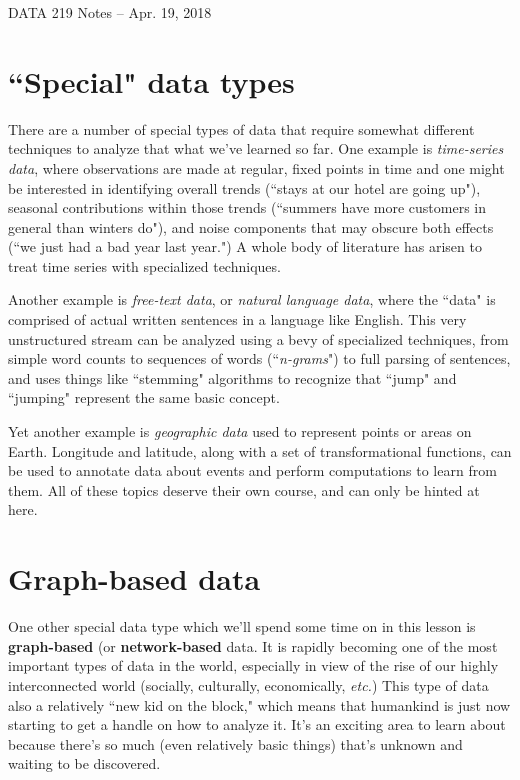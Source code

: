 \documentclass[12pt]{article}
\begin{document}
\begin{center}
\begin{Large}
DATA 219 Notes -- Apr. 19, 2018
\end{Large}
\end{center}

\section{``Special" data types}

There are a number of special types of data that require somewhat different 
techniques to analyze that what we've learned so far. One example is
\textit{time-series data}, where observations are made at regular, fixed
points in time and one might be interested in identifying overall trends
(``stays at our hotel are going up"), seasonal contributions within those
trends (``summers have more customers in general than winters do"), and noise
components that may obscure both effects (``we just had a bad year last
year.") A whole body of literature has arisen to treat time series with
specialized techniques.

Another example is \textit{free-text data}, or \textit{natural language data},
where the ``data" is comprised of actual written sentences in a language like
English. This very unstructured stream can be analyzed using a bevy of
specialized techniques, from simple word counts to sequences of words
(``\textit{n-grams}") to full parsing of sentences, and uses things like
``stemming" algorithms to recognize that ``jump" and ``jumping" represent the
same basic concept.

Yet another example is \textit{geographic data} used to represent points or
areas on Earth. Longitude and latitude, along with a set of transformational
functions, can be used to annotate data about events and perform computations
to learn from them. All of these topics deserve their own course, and can only
be hinted at here.

\section{Graph-based data}

One other special data type which we'll spend some time on in this lesson is
\textbf{graph-based} (or \textbf{network-based} data. It is rapidly becoming
one of the most important types of data in the world, especially in view of
the rise of our highly interconnected world (socially, culturally,
economically, \textit{etc.}) This type of data also a relatively ``new kid on
the block," which means that humankind is just now starting to get a handle on
how to analyze it. It's an exciting area to learn about because there's so
much (even relatively basic things) that's unknown and waiting to be
discovered.
\end{document}
